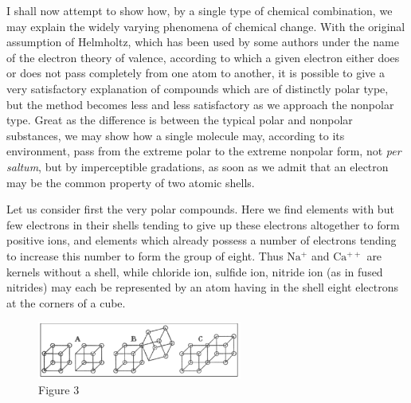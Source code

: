 \documentclass[11pt]{memoir}
\begin{document}
I shall now attempt to show how, by a single type of chemical combination, we may explain the widely varying phenomena of chemical change.  With the original assumption of Helmholtz, which has been used by some authors under the name of the electron theory of valence, according to which a given electron either does or does not pass completely from one atom to another, it is possible to give a very satisfactory explanation of compounds which are of distinctly polar type, but the method becomes less and less satisfactory as we approach the nonpolar type.  Great as the difference is between the typical polar and nonpolar substances, we may show how a single molecule may, according to its environment, pass from the extreme polar to the extreme nonpolar form, not \emph{per saltum}, but by imperceptible gradations, as soon as we admit that an electron may be the common property of two atomic shells.

Let us consider first the very polar compounds.  Here we find elements with but few electrons in their shells tending to give up these electrons altogether to form positive ions, and elements which already possess a number of electrons tending to increase this number to form the group of eight.  Thus $\mathrm{Na^+}$ and $\mathrm{Ca^{++}}$ are kernels without a shell, while chloride ion, sulfide ion, nitride ion (as in fused nitrides) may each be represented by an atom having in the shell eight electrons at the corners of a cube.


\begin{figure}
	\begin{center}
		\includegraphics[width=0.6\textwidth]{images/lewis_figure3.png}
	\end{center}
	\caption*{Figure 3}


\end{figure}
\end{document}
